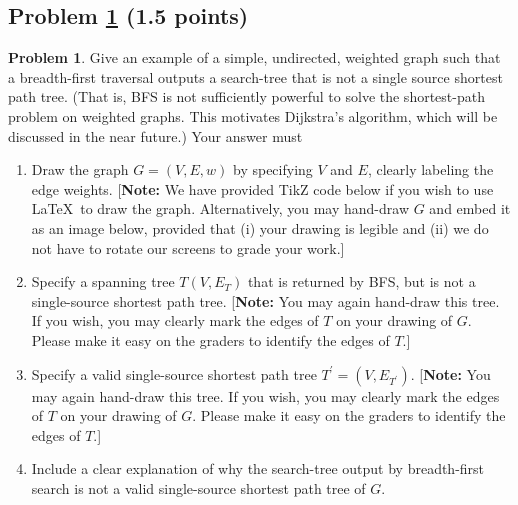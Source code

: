 \documentclass[11pt]{article}
\theoremstyle{definition}
\theoremstyle{definition}
\newtheorem{required}{Problem}
\theoremstyle{definition}
\begin{document}
\newpage
\subsection{Problem \ref{DFS4} (1.5 points)}
\begin{required} \label{DFS4}
	Give an example of a simple, undirected, weighted graph such that a breadth-first traversal outputs a search-tree that is not a single source shortest path tree. (That is, BFS is not sufficiently powerful to solve the shortest-path problem on weighted graphs. This motivates Dijkstra's algorithm, which will be discussed in the near future.) 
	Your answer must
	\begin{enumerate}[label=(\alph*)]
		\item Draw the graph $G = (V,E, w)$ by specifying $V$ and $E$, clearly labeling the edge weights.  [\textbf{Note:} We have provided TikZ code below if you wish to use \LaTeX \ to draw the graph. Alternatively, you may hand-draw $G$ and embed it as an image below, provided that (i) your drawing is legible and (ii) we do not have to rotate our screens to grade your work.]
		\item Specify a spanning tree $T(V, E_{T})$ that is returned by BFS, but is not a single-source shortest path tree. [\textbf{Note:} You may again hand-draw this tree. If you wish, you may clearly mark the edges of $T$ on your drawing of $G$. Please make it easy on the graders to identify the edges of $T$.] 

		\item Specify a valid single-source shortest path tree $T^{\prime} = (V,E_{T^{\prime}})$.  [\textbf{Note:} You may again hand-draw this tree. If you wish, you may clearly mark the edges of $T$ on your drawing of $G$. Please make it easy on the graders to identify the edges of $T$.] 

		\item Include a clear explanation of why the search-tree output by breadth-first search is not a valid single-source shortest path tree of $G$.
	\end{enumerate}
\end{required}
\end{document}
